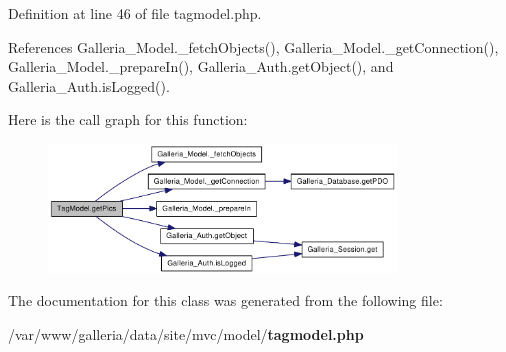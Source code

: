 Definition at line 46 of file tagmodel.php.

References Galleria\_\-Model.\_\-fetchObjects(), Galleria\_\-Model.\_\-getConnection(), Galleria\_\-Model.\_\-prepareIn(), Galleria\_\-Auth.getObject(), and Galleria\_\-Auth.isLogged().

Here is the call graph for this function:\nopagebreak
\begin{figure}[H]
\begin{center}
\leavevmode
\includegraphics[width=262pt]{classTagModel_49a371996b0e0684a5689abd6c160843_cgraph}
\end{center}
\end{figure}


The documentation for this class was generated from the following file:\begin{CompactItemize}
\item 
/var/www/galleria/data/site/mvc/model/{\bf tagmodel.php}\end{CompactItemize}
